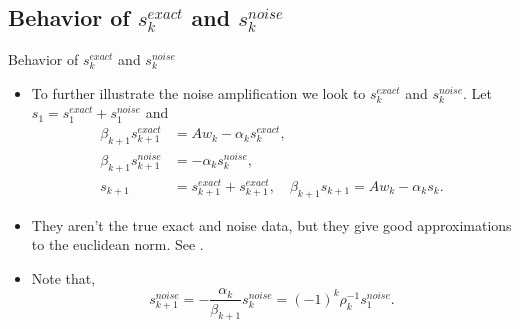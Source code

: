 \documentclass{beamer}
\begin{document}
\subsection{Behavior of $s_{k}^{exact}$ and $s_{k}^{noise}$}
\begin{frame}{Behavior of $s_{k}^{exact}$ and $s_{k}^{noise}$}
  \begin{itemize}
    \item To further illustrate the noise amplification we look to
      $s_{k}^{exact}$ and $s_{k}^{noise}$. Let $s_{1} = s_{1}^{exact} + 
      s_{1}^{noise}$ and
      \begin{align*}
	\beta_{k+1}s_{k+1}^{exact} &= Aw_{k} - \alpha_{k}s_{k}^{exact}, \\
	\beta_{k+1}s_{k+1}^{noise} &= -\alpha_{k}s_{k}^{noise}, \\
	s_{k+1} &= s_{k+1}^{exact} + s_{k+1}^{exact}, \quad 
	\beta_{k+1}s_{k+1} = Aw_{k} - \alpha_{k}s_{k}.
      \end{align*}
      
    \item They aren't the true exact and noise data, but they give good
      approximations to the euclidean norm. See \cite{bidiagonalization}.

    \item Note that,
      \begin{equation*}
	s_{k+1}^{noise} = -\frac{\alpha_{k}}{\beta_{k+1}}s_{k}^{noise} =
	(-1)^{k}\rho_{k}^{-1}s_{1}^{noise}.
      \end{equation*}
  \end{itemize}
\end{frame}
\end{document}
